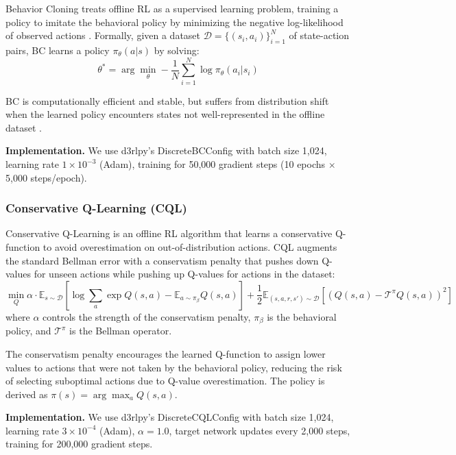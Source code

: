 Behavior Cloning treats offline RL as a supervised learning problem, training a policy to imitate the behavioral policy by minimizing the negative log-likelihood of observed actions \citep{pomerleau1991bc}. Formally, given a dataset $\mathcal{D} = \{(s_i, a_i)\}_{i=1}^N$ of state-action pairs, BC learns a policy $\pi_{\theta}(a|s)$ by solving:
\begin{equation}
\theta^* = \arg\min_{\theta} -\frac{1}{N} \sum_{i=1}^N \log \pi_{\theta}(a_i | s_i)
\end{equation}

BC is computationally efficient and stable, but suffers from distribution shift when the learned policy encounters states not well-represented in the offline dataset \citep{ross2010dagger}.

\textbf{Implementation.} We use d3rlpy's DiscreteBCConfig with batch size 1,024, learning rate $1 \times 10^{-3}$ (Adam), training for 50,000 gradient steps (10 epochs $\times$ 5,000 steps/epoch).

\subsubsection{Conservative Q-Learning (CQL)}

Conservative Q-Learning \citep{kumar2020cql} is an offline RL algorithm that learns a conservative Q-function to avoid overestimation on out-of-distribution actions. CQL augments the standard Bellman error with a conservatism penalty that pushes down Q-values for unseen actions while pushing up Q-values for actions in the dataset:
\begin{equation}
\min_Q \alpha \cdot \mathbb{E}_{s \sim \mathcal{D}} \left[ \log \sum_a \exp Q(s, a) - \mathbb{E}_{a \sim \pi_\beta} Q(s, a) \right] + \frac{1}{2} \mathbb{E}_{(s,a,r,s') \sim \mathcal{D}} \left[ (Q(s,a) - \mathcal{T}^\pi Q(s,a))^2 \right]
\end{equation}
where $\alpha$ controls the strength of the conservatism penalty, $\pi_\beta$ is the behavioral policy, and $\mathcal{T}^\pi$ is the Bellman operator.

The conservatism penalty encourages the learned Q-function to assign lower values to actions that were not taken by the behavioral policy, reducing the risk of selecting suboptimal actions due to Q-value overestimation. The policy is derived as $\pi(s) = \arg\max_a Q(s, a)$.

\textbf{Implementation.} We use d3rlpy's DiscreteCQLConfig with batch size 1,024, learning rate $3 \times 10^{-4}$ (Adam), $\alpha = 1.0$, target network updates every 2,000 steps, training for 200,000 gradient steps.

